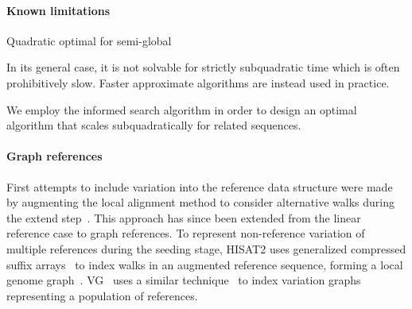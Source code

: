 \paragraph{Known limitations}

Quadratic optimal for semi-global

In its general case, it is not solvable for strictly subquadratic time which is
often prohibitively slow. Faster approximate algorithms are instead used in
practice.

We employ the \A informed search algorithm in order to design an
optimal algorithm that scales subquadratically for related sequences.

\paragraph{Graph references}
First attempts to include variation into the reference data structure were made
by augmenting the local alignment method to consider alternative walks during the
extend step~\cite{schneeberger_simultaneous_2009,palmapper}. This approach has
since been extended from the linear reference case to graph references. To
represent non-reference variation of multiple references during the seeding
stage, HISAT2 uses generalized compressed suffix
arrays~\cite{siren_indexing_2014} to index walks in an augmented reference
sequence, forming a local genome graph~\cite{kim_graphbased_2019}.
VG~\cite{garrison_variation_2018} uses a similar
technique~\cite{siren_indexing_2017} to index variation graphs representing a
population of references.